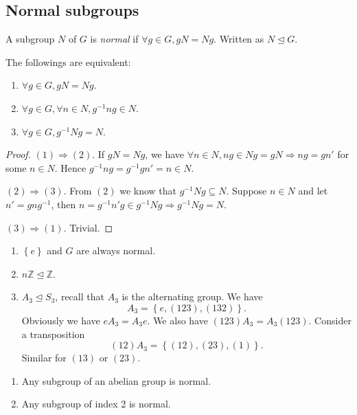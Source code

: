 \documentclass[10pt]{article}
\begin{document}
    \subsection{Normal subgroups}
    \begin{definition}
        A subgroup $N$ of $G$ is \textit{normal} if $ \forall g\in G, gN=Ng $. Written as $ N \trianglelefteq G $.
    \end{definition}
    \begin{proposition}
        The followings are equivalent:
        \begin{enumerate}[(1)]
            \item $ \forall g\in G, gN=Ng $.
            \item $ \forall g\in G, \forall n\in N, g^{-1}ng\in N $.
            \item $ \forall g\in G, g^{-1}Ng=N $.
        \end{enumerate}
    \end{proposition}
    \begin{proof}
        $ (1)\Rightarrow (2) $. If $ gN=Ng $, we have $ \forall n\in N, ng\in Ng=gN \Rightarrow ng=gn' $ for some $n\in N$. Hence $ g^{-1}ng=g^{-1}gn'=n\in N $.

        $ (2) \Rightarrow (3) $. From $(2)$ we know that $ g^{-1}Ng \subseteq N $. Suppose $ n\in N $ and let $ n'=gng^{-1} $, then $ n=g^{-1}n'g\in g^{-1}Ng \Rightarrow g^{-1}Ng = N $.

        $ (3) \Rightarrow (1) $. Trivial.
    \end{proof}
    \begin{example}
        \begin{enumerate}[(1)]
            \item $ \left\{ e\right\} $ and $G$ are always normal.
            \item $ n \mathbb{Z}\trianglelefteq \mathbb{Z}$.
            \item $ A_3 \trianglelefteq S_3 $, recall that $ A_3 $ is the alternating group. We have
            \[
                A_3=\left\{ e,(123),(132)\right\}
            .\]
            Obviously we have $ eA_3=A_3e $. We also have $(123)A_3=A_3(123)$. Consider a transposition
            \[
                (12)A_3=\left\{(12),(23),(1) \right\}
            .\]
            Similar for $(13)$ or $(23)$.
        \end{enumerate}
    \end{example}
    \begin{proposition}
        \begin{enumerate}[(1)]
            \item Any subgroup of an abelian group is normal.
            \item Any subgroup of index 2 is normal.
        \end{enumerate}
    \end{proposition}
\end{document}
